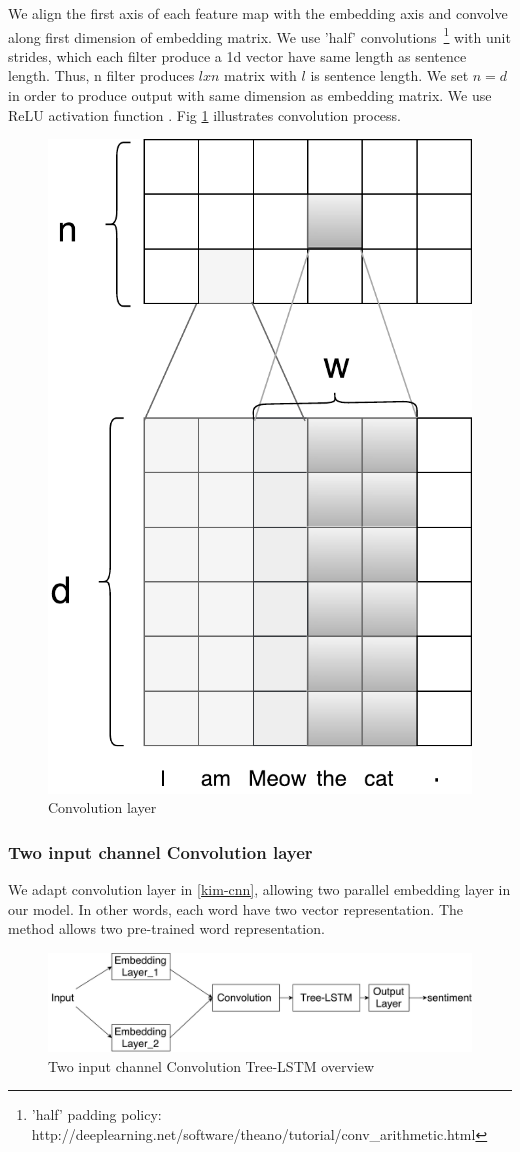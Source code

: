 We align the first axis of each feature map with the embedding axis and convolve along first dimension of embedding matrix. 
We use 'half' convolutions~\footnote{'half' padding policy: http://deeplearning.net/software/theano/tutorial/conv\_arithmetic.html} with unit strides, which each filter produce a 1d vector have same length as sentence length. 
Thus, n filter produces $l x n$ matrix with $l$ is sentence length. We set $n = d$ in order to produce output with same dimension as embedding matrix. We use ReLU activation function \cite{hahnloser2000digital}. Fig \ref{fig:convlayer} illustrates convolution process. 



\begin{figure}[H]
	\centering
	\includegraphics[width=0.4\linewidth]{figure/convlayer}
	\caption[Convolution layer]{Convolution layer}
	\label{fig:convlayer}
\end{figure}

\subsubsection{Two input channel Convolution layer} \label{sec:conv2c}
We adapt convolution layer in \ref{kim-cnn}, allowing two parallel embedding layer in our model. In other words, each word have two vector representation. The method allows two pre-trained word representation. 

\begin{figure}[H]
	\centering
	\includegraphics[width=0.8\linewidth]{figure/multichannelcnnlstm}
	\caption[Convolution Tree-LSTM overview]{Two input channel Convolution Tree-LSTM overview}
	\label{fig:multichannelcnnlstm}
\end{figure}

